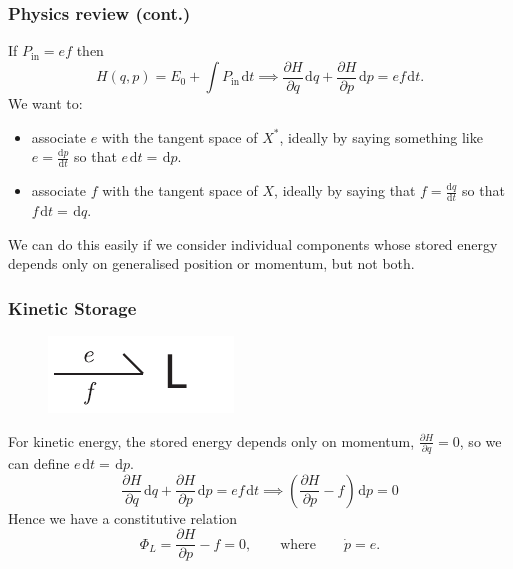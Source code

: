 \documentclass[11pt,reqno]{beamer}
\newcommand{\D}[2]{\frac{\mathrm{d} #1}{\mathrm{d} #2}}
\renewcommand{\P}[2]{\frac{\partial #1}{\partial #2}}
\newcommand{\df}[1]{\mspace{2mu}  \mathrm{d}#1}
\begin{document}
\begin{frame}
\frametitle{Physics review (cont.)}
If $P_\text{in} = ef$ then
\[
H(q, p) = E_0 + \int P_\text{in}\df{t} \implies \P{H}{q} \df{q} + \P{H}{p}\df{p} = ef\df{t}.
\]
We want to:
\begin{itemize}
	\item associate $e$ with the tangent space of $X^*$, ideally by saying something like $e = \D{p}{t}$ so that $e\df{t} =\df{p}$.
	\item associate $f$ with the tangent space of $X$, ideally by saying that $f = \D{q}{t}$ so that $f\df{t} = \df{q}$.
\end{itemize}
We can do this easily if we consider individual components whose stored energy depends only on generalised position or momentum, but not both.
\end{frame}
\begin{frame}
\frametitle{Kinetic Storage}
\begin{figure}
	\includegraphics{images/oneport-L.pdf}
\end{figure}
For kinetic energy, the stored energy depends only on momentum, $\P{H}{q} = 0$, so we can define $e\df{t} = \df{p}$.
\[
\P{H}{q} \df{q} + \P{H}{p}\df{p} = ef\df{t} \implies  \left(\P{H}{p} - f\right)\df{p}= 0
\]
Hence we have a constitutive relation
\[
\Phi_L = \P{H}{p} - f= 0, \qquad  \text{where}\qquad \dot{p} = e.
\]
\end{frame}
\end{document}
